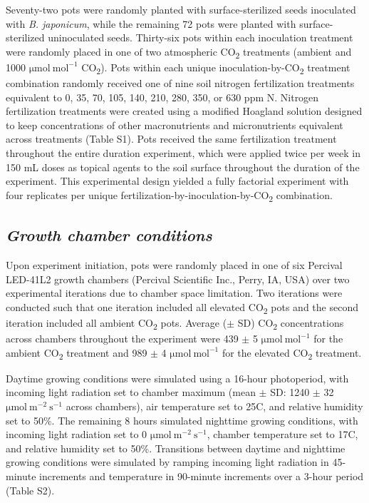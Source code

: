 Seventy-two pots were randomly planted with surface-sterilized seeds inoculated with \textit{B. japonicum}, while the remaining 72 pots were planted with surface-sterilized uninoculated seeds. Thirty-six pots within each inoculation treatment were randomly placed in one of two atmospheric CO\textsubscript{2} treatments (ambient and 1000 $\mathrm{\mu mol\ mol^{-1}}$ CO\textsubscript{2}). Pots within each unique inoculation-by-CO\textsubscript{2} treatment combination randomly received one of nine soil nitrogen fertilization treatments equivalent to 0, 35, 70, 105, 140, 210, 280, 350, or 630 ppm N. Nitrogen fertilization treatments were created using a modified Hoagland solution  designed to keep concentrations of other macronutrients and micronutrients equivalent across treatments (Table S1). Pots received the same fertilization treatment throughout the entire duration experiment, which were applied twice per week in 150 mL doses as topical agents to the soil surface throughout the duration of the experiment. This experimental design yielded a fully factorial experiment with four replicates per unique fertilization-by-inoculation-by-CO\textsubscript{2} combination.

\subsection{\textit{Growth chamber conditions}}
Upon experiment initiation, pots were randomly placed in one of six Percival LED-41L2 growth chambers (Percival Scientific Inc., Perry, IA, USA) over two experimental iterations due to chamber space limitation. Two iterations were conducted such that one iteration included all elevated CO\textsubscript{2} pots and the second iteration included all ambient CO\textsubscript{2} pots. Average ($\pm$ SD) CO\textsubscript{2} concentrations across chambers throughout the experiment were 439 $\pm$ 5 $\mathrm{\mu mol\ mol^{-1}}$ for the ambient CO\textsubscript{2} treatment and 989 $\pm$ 4 $\mathrm{\mu mol\ mol^{-1}}$ for the elevated CO\textsubscript{2} treatment.
    
Daytime growing conditions were simulated using a 16-hour photoperiod, with incoming light radiation set to chamber maximum (mean $\pm$ SD: 1240 $\pm$ 32 $\mathrm{\mu mol\ m^{-2}\ s^{-1}}$ across chambers), air temperature set to 25\textdegree{}C, and relative humidity set to 50\%. The remaining 8 hours simulated nighttime growing conditions, with incoming light radiation set to 0 $\mathrm{\mu mol\ m^{-2}\ s^{-1}}$, chamber temperature set to 17\textdegree{}C, and relative humidity set to 50\%. Transitions between daytime and nighttime growing conditions were simulated by ramping incoming light radiation in 45-minute increments and temperature in 90-minute increments over a 3-hour period (Table S2).
    
